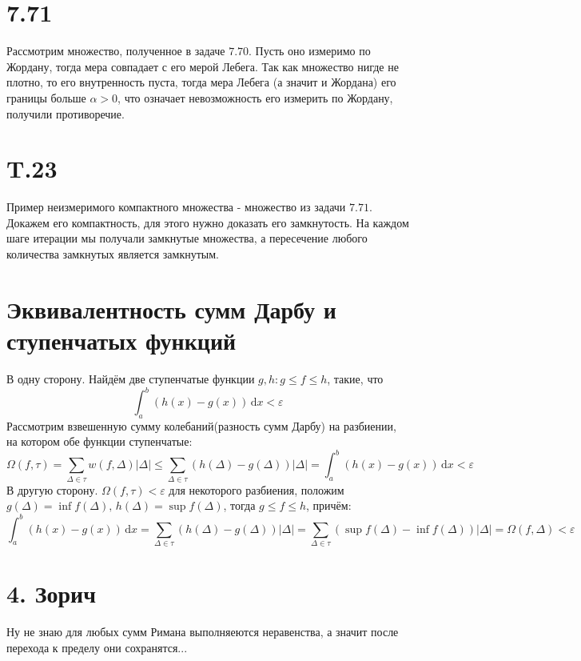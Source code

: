 \documentclass[12pt]{article}
\begin{document}
\section{7.71}
Рассмотрим множество, полученное в задаче $7.70$. Пусть оно измеримо по Жордану, тогда мера совпадает с его мерой Лебега. 
Так как множество нигде не плотно, то его внутренность пуста, тогда мера Лебега (а значит и Жордана) его границы больше $\alpha > 0$, что означает невозможность 
его измерить по Жордану, получили противоречие. 
\section{T.23}
Пример неизмеримого компактного множества - множество из задачи $7.71$. Докажем его компактность, для этого 
нужно доказать его замкнутость. На каждом шаге итерации мы получали замкнутые множества, а пересечение любого количества 
замкнутых является замкнутым.
\section{Эквивалентность сумм Дарбу и ступенчатых функций}
В одну сторону. Найдём две ступенчатые функции $g, h: g \leq f \leq h$, такие, что 
\[
    \int_{a}^{b} (h(x) - g(x)) \,\mathrm{d}x < \varepsilon 
\]  
Рассмотрим взвешенную сумму колебаний(разность сумм Дарбу) на разбиении, на котором обе функции ступенчатые: 
\[
    \Omega(f, \tau) = \sum_{\Delta \in \tau} w(f, \Delta)\vert \Delta \vert \leq 
    \sum_{\Delta \in \tau} (h(\Delta) - g(\Delta))\vert \Delta \vert = \int_{a}^{b} (h(x) - g(x)) \,\mathrm{d}x < \varepsilon 
\]
В другую сторону. $\Omega(f, \tau) < \varepsilon$ для некоторого разбиения, положим 
$g(\Delta) = \inf f(\Delta), \, h(\Delta) = \sup f(\Delta)$, тогда 
$g \leq f \leq h$, причём:
\[
    \int_{a}^{b} (h(x) - g(x)) \,\mathrm{d}x = 
    \sum_{\Delta \in \tau} (h(\Delta) - g(\Delta))\vert \Delta \vert = 
    \sum_{\Delta \in \tau} (\sup f(\Delta) - \inf f(\Delta))\vert \Delta \vert = \Omega(f, \Delta) < \varepsilon
\] 
\section{4. Зорич}
Ну не знаю для любых сумм Римана выполняеются неравенства, а значит после перехода к пределу 
они сохранятся...
\end{document}
